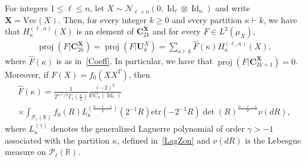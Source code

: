 \documentclass[AHL,Unicode,longabstracts,published]{cedram}
\DeclareMathOperator{\proj}{proj}
\DeclareMathOperator{\Id}{Id}
\newcommand{\scN}{\mathscr{N}}
\renewcommand{\Vec}{\mathrm{Vec}}
\newcommand{\bfX}{\mathbf{X}}
\newcommand{\bfC}{\mathbf{C}}
\newcommand{\bfU}{\mathbf{U}}
\newcommand{\clP}{\mathcal{P}}
\newcommand{\R}{\mathbb{R}}
\newcommand{\etr}[1]{\mathrm{etr}\left(#1\right)}
\begin{document}
\begin{theo}\label{ThmWC}
For integers $1\leq \ell \leq n$, let $X \sim \scN_{\ell \times n}(0, \Id_{\ell} \otimes \Id_n)$ and write $\bfX=\Vec(X)$. Then, for every integer $k\geq0$ and every partition $\kappa\vdash k$, we have that $H_{\kappa}^{(\ell,n)}(X)$ is an element of $\bfC_{2k}^{\bfX}$ and for every $F \in L^2(\mu_X)$,
\begin{gather}\label{proj2k}
\proj\left(F|\bfC_{2k}^{\bfX}\right) = \proj\left(F|\bfU_k^X\right) =
\sum_{\kappa\vdash k} \widehat{F}(\kappa) H_{\kappa}^{(\ell,n)}(X),
\end{gather}
where $\widehat{F}(\kappa)$ is as in~\eqref{Coeff}. In particular, we have that $\proj(F|\bfC_{2k+1}^{\bfX})=0$. Moreover, if $F(X)=f_0(XX^T)$, then
\begin{multline}\label{RAD}
\widehat{F}(\kappa) = \frac{1}{2^{n\ell/2}\Gamma_{\ell}\left(\frac{n}{2}\right)}\frac{(-2)^{k}}{k!C_{\kappa}(\Id_{\ell})}\\
\times\int_{\clP_{\ell}(\R)} f_0(R) L_{\kappa}^{\left(\frac{n-\ell-1}{2}\right)}(2^{-1}R) \etr{-2^{-1}R} \det(R)^{\frac{n-\ell-1}{2}}\nu(dR),
\end{multline}
where $L_{\kappa}^{(\gamma)}$ denotes the generalized Laguerre polynomial of order $\gamma>-1$ associated with the partition $\kappa$, defined in~\eqref{LagZon} and $\nu(dR)$ is the Lebesgue measure on $\clP_{\ell}(\R)$.
\end{theo}
\end{document}
